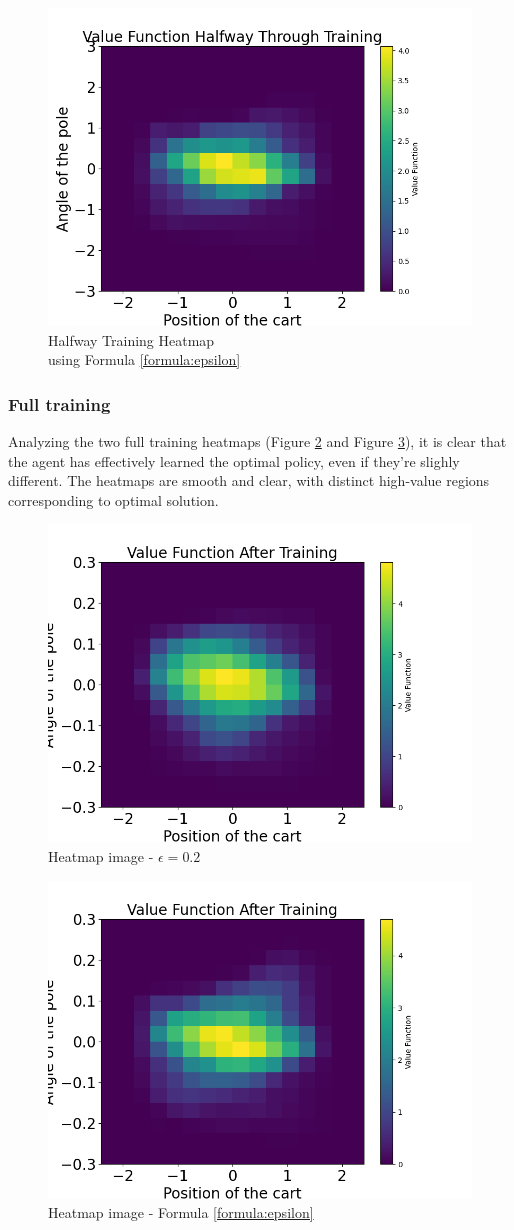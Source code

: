 \documentclass{article}
\begin{document}
\begin{figure}[h]
		\centering
		\includegraphics[height=0.28\linewidth]{../data/plot/heatmap_halfway_GLIE.png}
		\caption{Halfway Training Heatmap  \\ using Formula \ref{formula:epsilon}}
		\label{fig:heatmap_glie_half}
\end{figure}

\subsubsection{Full training}
Analyzing  the two full training heatmaps (Figure \ref{fig:heatmap_costant_full} and Figure \ref{fig:heatmap_glie_full}), it is clear that the agent has effectively learned the optimal policy, even if they're slighly different. The heatmaps are smooth and clear, with distinct high-value regions corresponding to optimal solution. 
\begin{figure}[h]
	\centering
	\includegraphics[height=0.28\linewidth]{../data/plot/heatmap_full_training_constant_0.2.png}
	\caption{Heatmap image - $\epsilon = 0.2$}
	\label{fig:heatmap_costant_full}
\end{figure}

\begin{figure}[h]
	\centering
	\includegraphics[height=0.28\linewidth]{../data/plot/heatmap_full_training_GLIE.png}
	\caption{Heatmap image - Formula \ref{formula:epsilon}}
	\label{fig:heatmap_glie_full}
\end{figure}
\end{document}
